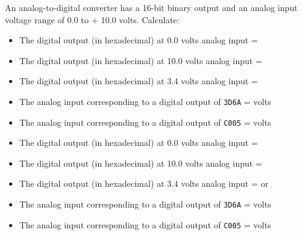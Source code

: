 

An analog-to-digital converter has a 16-bit binary output and an analog input voltage range of 0.0 to + 10.0 volts.  Calculate:

\begin{itemize}
\item{} The digital output (in hexadecimal) at 0.0 volts analog input = \underbar{\hskip 50pt}
\vskip 10pt
\item{} The digital output (in hexadecimal) at 10.0 volts analog input = \underbar{\hskip 50pt}
\vskip 10pt
\item{} The digital output (in hexadecimal) at 3.4 volts analog input = \underbar{\hskip 50pt}
\vskip 10pt
\item{} The analog input corresponding to a digital output of {\tt 3D6A} = \underbar{\hskip 50pt} volts
\vskip 10pt
\item{} The analog input corresponding to a digital output of {\tt C005} = \underbar{\hskip 50pt} volts
\end{itemize}







\begin{itemize}
\item{} The digital output (in hexadecimal) at 0.0 volts analog input = 
\vskip 10pt
\item{} The digital output (in hexadecimal) at 10.0 volts analog input = 
\vskip 10pt
\item{} The digital output (in hexadecimal) at 3.4 volts analog input =  or 
\vskip 10pt
\item{} The analog input corresponding to a digital output of {\tt 3D6A} =  volts
\vskip 10pt
\item{} The analog input corresponding to a digital output of {\tt C005} =  volts
\end{itemize}













